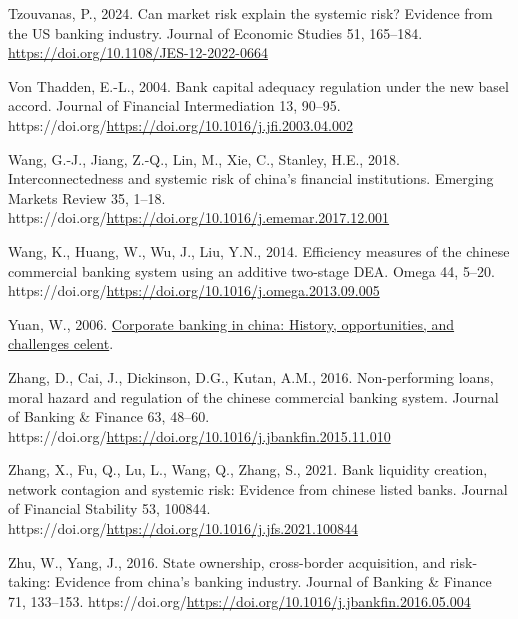 \documentclass[
  letterpaper,
  DIV=11,
  numbers=noendperiod]{scrreprt}
\newlength{\cslhangindent}
\newenvironment{CSLReferences}[2] %
 {\begin{list}{}{%
  \setlength{\itemindent}{0pt}
  \setlength{\leftmargin}{0pt}
  \setlength{\parsep}{0pt}
  \ifodd #1
   \setlength{\leftmargin}{\cslhangindent}
   \setlength{\itemindent}{-1\cslhangindent}
  \fi
  \setlength{\itemsep}{#2\baselineskip}}}
 {\end{list}}
\begin{document}
\begin{CSLReferences}{1}{0}
Tzouvanas, P., 2024. Can market risk explain the systemic risk? Evidence
from the US banking industry. Journal of Economic Studies 51, 165--184.
\url{https://doi.org/10.1108/JES-12-2022-0664}

Von Thadden, E.-L., 2004. Bank capital adequacy regulation under the new
basel accord. Journal of Financial Intermediation 13, 90--95.
https://doi.org/\url{https://doi.org/10.1016/j.jfi.2003.04.002}

Wang, G.-J., Jiang, Z.-Q., Lin, M., Xie, C., Stanley, H.E., 2018.
Interconnectedness and systemic risk of china's financial institutions.
Emerging Markets Review 35, 1--18.
https://doi.org/\url{https://doi.org/10.1016/j.ememar.2017.12.001}

Wang, K., Huang, W., Wu, J., Liu, Y.N., 2014. Efficiency measures of the
chinese commercial banking system using an additive two-stage DEA. Omega
44, 5--20.
https://doi.org/\url{https://doi.org/10.1016/j.omega.2013.09.005}

Yuan, W., 2006.
\href{https://www.celent.com/insights/314000619}{Corporate banking in
china: History, opportunities, and challenges \textbar{} celent}.

Zhang, D., Cai, J., Dickinson, D.G., Kutan, A.M., 2016. Non-performing
loans, moral hazard and regulation of the chinese commercial banking
system. Journal of Banking \& Finance 63, 48--60.
https://doi.org/\url{https://doi.org/10.1016/j.jbankfin.2015.11.010}

Zhang, X., Fu, Q., Lu, L., Wang, Q., Zhang, S., 2021. Bank liquidity
creation, network contagion and systemic risk: Evidence from chinese
listed banks. Journal of Financial Stability 53, 100844.
https://doi.org/\url{https://doi.org/10.1016/j.jfs.2021.100844}

Zhu, W., Yang, J., 2016. State ownership, cross-border acquisition, and
risk-taking: Evidence from china's banking industry. Journal of Banking
\& Finance 71, 133--153.
https://doi.org/\url{https://doi.org/10.1016/j.jbankfin.2016.05.004}

\end{CSLReferences}
\end{document}
